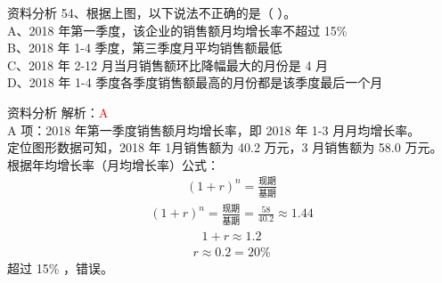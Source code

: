 \documentclass[aspectratio=169]{beamer}
\begin{document}
\begin{frame}[t]{资料分析}
    54、根据上图，以下说法不正确的是（ ）。                         \\
    A、2018 年第一季度，该企业的销售额月均增长率不超过 15\%         \\
    B、2018 年 1-4 季度，第三季度月平均销售额最低                   \\
    C、2018 年 2-12 月当月销售额环比降幅最大的月份是 4 月           \\ 
    D、2018 年 1-4 季度各季度销售额最高的月份都是该季度最后一个月   \\
\end{frame}                           


\begin{frame}[t]{资料分析}
    解析：\textcolor{red}{A}\\
    A 项：2018 年第一季度销售额月均增长率，即 2018 年 1-3 月月均增长率。\\
    定位图形数据可知，2018 年 1月销售额为 40.2 万元，3 月销售额为 58.0 万元。\\
    根据年均增长率（月均增长率）公式：\\
    { \tiny
    \begin{gather}
        (1+r)^n = \frac{\text{现期}}{\text{基期}}
    \end{gather}
    }
    { \tiny
    \begin{gather}
        (1+r)^n = \frac{\text{现期}}{\text{基期}} = \frac{58}{40.2} \approx 1.44
    \end{gather}
    }
    { \tiny
    \begin{gather}
        1+r \approx 1.2
    \end{gather}
    }
    { \tiny
    \begin{gather}
        r \approx 0.2  = 20\% 
    \end{gather}
    }
    超过 15\% ，错误。
\end{frame}                           
\end{document}
